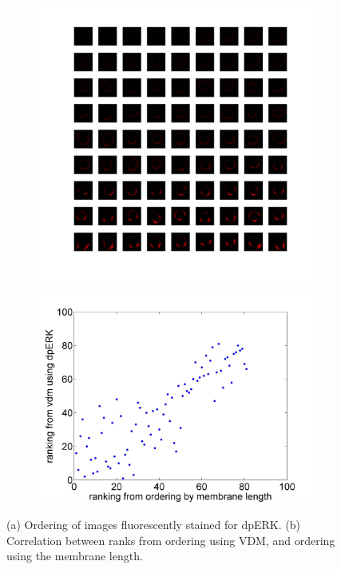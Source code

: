 \documentclass[11pt]{article}
\begin{document}
\begin{figure}[h]
\begin{subfigure}[c]{0.45\textwidth}
\includegraphics[width=\textwidth]{dpERK_array}
\caption{}
\end{subfigure}
\begin{subfigure}[c]{0.5\textwidth}
\includegraphics[width=\textwidth]{dpERK_rank_corr}
\caption{}
\end{subfigure}
\caption{(a) Ordering of images fluorescently stained for dpERK. (b) Correlation between ranks from ordering using VDM, and ordering using the membrane length.}
\label{fig:dpERK}
\end{figure}
\end{document}

